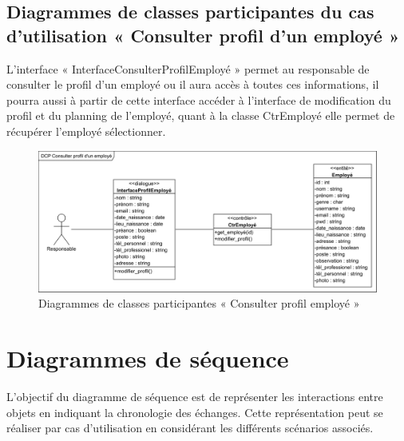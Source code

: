 \begin{itemize}
        \subsection*{Diagrammes de classes participantes du cas d'utilisation « Consulter profil d'un employé »}
        L’interface « InterfaceConsulterProfilEmployé » permet au responsable de consulter le profil d’un employé ou il aura accès à toutes ces informations, il pourra aussi à partir de cette interface accéder à l’interface de modification du profil et du planning de l’employé, quant à la classe CtrEmployé elle permet de récupérer l’employé sélectionner. 
            \begin{figure}[h!]
                 \centering
                \includegraphics[scale=0.72]{images/DCP/DCP_consulter_profil_d'un_employe.png}
                 \caption{Diagrammes de classes participantes « Consulter profil employé »}
                 \label{fig32}
            \end{figure}
             
\section{Diagrammes de séquence}
    L’objectif du diagramme de séquence est de représenter les interactions entre objets en indiquant la chronologie des échanges. Cette représentation peut se réaliser par cas d’utilisation en considérant les différents scénarios associés. \cite{9} 
    

\end{itemize}
